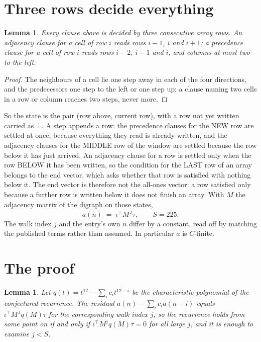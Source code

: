 \documentclass[11pt,a4paper]{article}
\theoremstyle{plain}
\newtheorem{lemma}[theorem]{Lemma}
\theoremstyle{definition}
\begin{document}
\section{Three rows decide everything}

\begin{lemma}\label{lem:win}
Every clause above is decided by three consecutive array rows. An adjacency clause for a cell
of row $i$ reads rows $i-1$, $i$ and $i+1$; a precedence clause for a cell of row $i$ reads
rows $i-2$, $i-1$ and $i$, and columns at most two to the left.
\end{lemma}

\begin{proof}
The neighbours of a cell lie one step away in each of the four directions, and the predecessors
one step to the left or one step up; a clause naming two cells in a row or column reaches two
steps, never more.
\end{proof}

So the state is the pair (row above, current row), with a row not yet written carried as
$\bot$. A step appends a row: the precedence clauses for the NEW row are settled at once,
because everything they read is already written, and the adjacency clauses for the MIDDLE row
of the window are settled because the row below it has just arrived. An adjacency clause for a row is settled only when the row BELOW it has been
written, so the condition for the LAST row of an array belongs to the end vector, which asks
whether that row is satisfied with nothing below it. The end vector is therefore not the
all-ones vector: a row satisfied only because a further row is written below it does not
finish an array. With $M$ the
adjacency matrix of the digraph on those states,
\[
a(n)\;=\;\iota^{\!\top}M^{\,j}\tau ,\qquad S=225.
\]
The walk index $j$ and the entry's own $n$ differ by a constant, read off by matching the
published terms rather than assumed. In particular $a$ is $C$-finite.

\section{The proof}

\begin{lemma}\label{lem:crit}
Let $q(t)=t^{12}-\sum_i c_it^{12-i}$ be the characteristic polynomial of the
conjectured recurrence. The residual $a(n)-\sum_ic_ia(n-i)$ equals
$\iota^{\!\top}M^{\,j}q(M)\tau$ for the corresponding walk index $j$, so the recurrence
holds from some point on if and only if $\iota^{\!\top}M^{j}q(M)\tau=0$ for all large $j$,
and it is enough to examine $j<S$.
\end{lemma}
\end{document}
